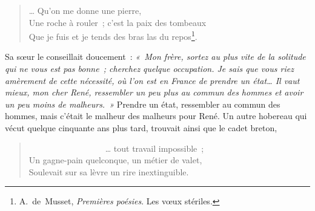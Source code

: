 \documentclass[french,twoside]{book} %
\begin{document}
\begin{verse}
… Qu’on me donne une pierre,\\
Une roche à rouler ; c’est la paix des tombeaux\\
Que je fuis et je tends des bras las du repos\footnote{A. de Musset, \emph{Premières poésies}. Les vœux stériles.}.\\
\end{verse}

\noindent Sa sœur le conseillait doucement : \emph{« Mon frère, sortez au plus vite  
\label{p581}de la solitude qui ne vous est pas bonne ; cherchez quelque occupation. Je sais que vous riez amèrement de cette nécessité, où l’on est en France de prendre un état… Il vaut mieux, mon cher René, ressembler un peu plus au commun des hommes et avoir un peu moins de malheurs. »} Prendre un état, ressembler au commun des hommes, mais c’était le malheur des malheurs pour René. Un autre hobereau qui vécut quelque cinquante ans plus tard, trouvait ainsi que le cadet breton,\par


\begin{verse}
                  … tout travail impossible ;\\
Un gagne-pain quelconque, un métier de valet,\\
Soulevait sur sa lèvre un rire inextinguible.\\
\end{verse}
\end{document}
